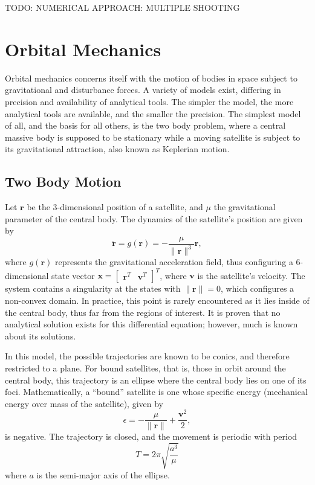 TODO: NUMERICAL APPROACH: MULTIPLE SHOOTING


\section{Orbital Mechanics}

Orbital mechanics concerns itself with the motion of bodies in space subject to gravitational and disturbance forces. A variety of models exist, differing in precision and availability of analytical tools. The simpler the model, the more analytical tools are available, and the smaller the precision. The simplest model of all, and the basis for all others, is the two body problem, where a central massive body is supposed to be stationary while a moving satellite is subject to its gravitational attraction, also known as Keplerian motion. 

\subsection{Two Body Motion}

Let \(\mathbf{r}\) be the 3-dimensional position of a satellite, and \(\mu \) the gravitational parameter of the central body. The dynamics of the satellite's position are given by~\cite{curtis2015orbital}
\begin{equation} \label{eq:kepler_dyn}
    \ddot{\mathbf{r}} = g(\mathbf{r}) = -\frac{\mu}{\lVert \mathbf{r} \rVert^3} \mathbf{r},
\end{equation}
where \(g(\mathbf{r})\) represents the gravitational acceleration field, thus configuring a 6-dimensional state vector \(\mathbf{x} = \begin{bmatrix}
    \mathbf{r}^T & \mathbf{v}^T
\end{bmatrix}^T\), where \(\mathbf{v}\) is the satellite's velocity. The system contains a singularity at the states with \(\lVert \mathbf{r} \rVert = 0\), which configures a non-convex domain. In practice, this point is rarely encountered as it lies inside of the central body, thus far from the regions of interest. It is proven that no analytical solution exists for this differential equation; however, much is known about its solutions.

In this model, the possible trajectories are known to be conics, and therefore restricted to a plane. For bound satellites, that is, those in orbit around the central body, this trajectory is an ellipse where the central body lies on one of its foci. Mathematically, a ``bound'' satellite is one whose specific energy (mechanical energy over mass of the satellite), given by~\cite{curtis2015orbital}
\begin{equation}
    \epsilon = -\frac{\mu}{\lVert \mathbf{r} \rVert} + \frac{\mathbf{v}^2}{2},
\end{equation}
is negative. The trajectory is closed, and the movement is periodic with period~\cite{curtis2015orbital}
\begin{equation}
    T = 2\pi \sqrt{\frac{a^3}{\mu}}
\end{equation}
where \(a\) is the semi-major axis of the ellipse.

